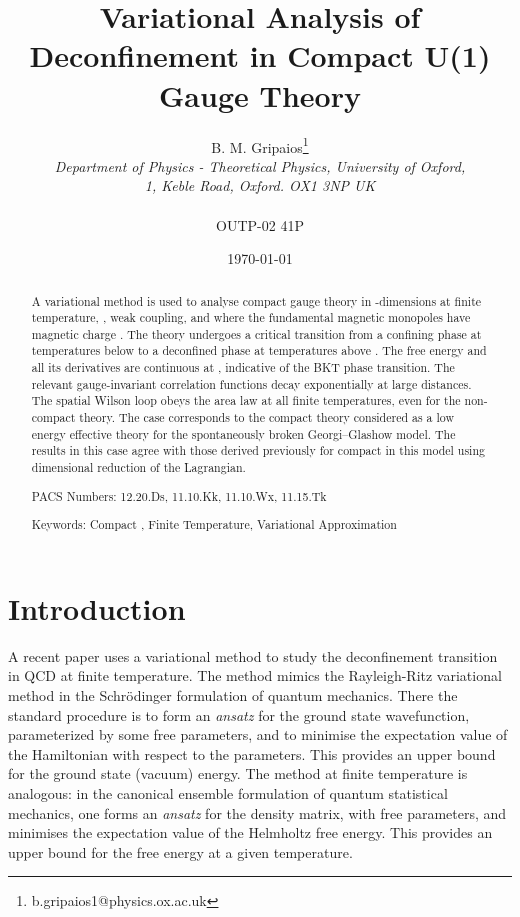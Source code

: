 \documentclass[a4paper,a4paper]{article}
\title{Variational Analysis of Deconfinement in Compact U(1) Gauge Theory}
\author{B. M. Gripaios\thanks{b.gripaios1@physics.ox.ac.uk}
\\\emph{Department of Physics - Theoretical Physics, University of Oxford,} 
\\ \emph{1, Keble Road, Oxford. OX1 3NP  UK
}
\\
\\ OUTP-02 41P 
}
\date{\today}
\begin{document}

\maketitle
\begin{abstract}
A variational method is used to analyse compact \coordHE{} gauge theory in \coordHE{}-dimensions 
at finite temperature, \coordHE{}, weak coupling, \coordHE{} and where the fundamental magnetic monopoles have magnetic charge \coordHE{}.
The theory undergoes a critical transition from a confining phase at temperatures below \coordHE{} to a 
deconfined phase at temperatures above \coordHE{}. The free energy and all its derivatives are continuous at \coordHE{}, indicative of the BKT
phase transition. 
The relevant gauge-invariant correlation functions decay exponentially at large distances. 
The spatial Wilson loop obeys the area law at all finite temperatures, even for the non-compact theory.
The case \coordHE{} corresponds to the compact \coordHE{} theory considered as a low energy effective theory
for the spontaneously broken Georgi--Glashow model. 
The results in this case agree with those derived previously for compact \coordHE{} in this model
using dimensional reduction of the Lagrangian.

PACS Numbers: 12.20.Ds, 11.10.Kk, 11.10.Wx, 11.15.Tk

Keywords: Compact \coordHE{}, Finite Temperature, Variational Approximation
\end{abstract}

\section{Introduction}
A recent paper \cite{Kogan:2002yr} uses a variational method to study the deconfinement transition in QCD 
at finite temperature. The method mimics the Rayleigh-Ritz variational method in the Schr\"{o}dinger formulation of
quantum mechanics. There the standard procedure is to form an \emph{ansatz} for the ground state wavefunction, 
parameterized by some
free parameters, and to minimise the expectation value of the Hamiltonian with respect to the parameters. 
This provides an upper bound for the ground state (vacuum) energy. The method at finite temperature is analogous: 
in the canonical ensemble formulation of quantum statistical mechanics, one forms an \emph{ansatz} for the density matrix,
with free parameters, and minimises the expectation value of the Helmholtz free energy. This provides an upper bound
for the free energy at a given temperature.
\end{document}
